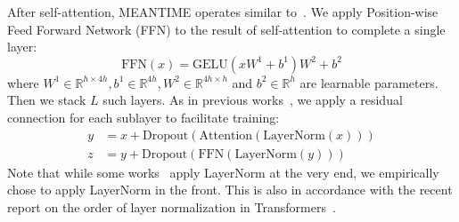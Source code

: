 After self-attention, MEANTIME operates similar to~\cite{BERT, BERT4Rec}. We apply Position-wise Feed Forward Network (FFN) to the result of self-attention to complete a single layer:
\begin{equation}
    \text{FFN}(x) = \text{GELU}(xW^1 + b^1)W^2 + b^2
\end{equation}
where $W^1 \in \mathbb{R}^{h \times 4h}, b^1 \in \mathbb{R}^{4h}, W^2 \in \mathbb{R}^{4h \times h}$ and $b^2 \in \mathbb{R}^{h}$ are learnable parameters. Then we stack $L$ such layers. As in previous works~\cite{TRANSFORMER, SASRec, BERT4Rec}, we apply a residual connection for each sublayer to facilitate training:
\begin{equation}
\begin{split}
  y &= x + \text{Dropout}(\text{Attention}(\text{LayerNorm}(x)))\\
  z &= y + \text{Dropout}(\text{FFN}(\text{LayerNorm}(y)))
\end{split}
\end{equation}
Note that while some works~\cite{TRANSFORMER, BERT4Rec} apply LayerNorm at the very end, we empirically chose to apply LayerNorm in the front. This is also in accordance with the recent report on the order of layer normalization in Transformers~\cite{LNORDER}.